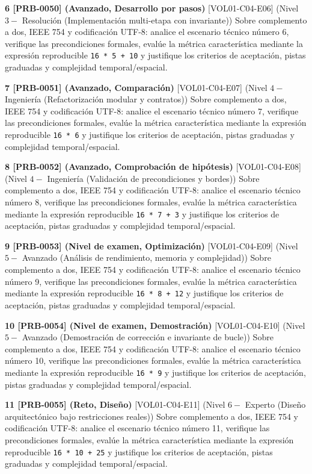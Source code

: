 \documentclass{book}
\begin{document}
\begin{tcolorbox}[title={Ejercicios}, studiumworked, breakable]
\noindent\textbf{6 [PRB-0050] (Avanzado, Desarrollo por pasos)}
[VOL01-C04-E06] (Nivel \(3 -\) Resolución (Implementación multi-etapa con invariante)) Sobre complemento a dos, IEEE 754 y codificación UTF-8: analice el escenario técnico número 6, verifique las precondiciones formales, evalúe la métrica característica mediante la expresión reproducible \texttt{16 * 5 + 10} y justifique los criterios de aceptación, pistas graduadas y complejidad temporal/espacial.

\noindent\textbf{7 [PRB-0051] (Avanzado, Comparación)}
[VOL01-C04-E07] (Nivel \(4 -\) Ingeniería (Refactorización modular y contratos)) Sobre complemento a dos, IEEE 754 y codificación UTF-8: analice el escenario técnico número 7, verifique las precondiciones formales, evalúe la métrica característica mediante la expresión reproducible \texttt{16 * 6} y justifique los criterios de aceptación, pistas graduadas y complejidad temporal/espacial.

\noindent\textbf{8 [PRB-0052] (Avanzado, Comprobación de hipótesis)}
[VOL01-C04-E08] (Nivel \(4 -\) Ingeniería (Validación de precondiciones y bordes)) Sobre complemento a dos, IEEE 754 y codificación UTF-8: analice el escenario técnico número 8, verifique las precondiciones formales, evalúe la métrica característica mediante la expresión reproducible \texttt{16 * 7 + 3} y justifique los criterios de aceptación, pistas graduadas y complejidad temporal/espacial.

\noindent\textbf{9 [PRB-0053] (Nivel de examen, Optimización)}
[VOL01-C04-E09] (Nivel \(5 -\) Avanzado (Análisis de rendimiento, memoria y complejidad)) Sobre complemento a dos, IEEE 754 y codificación UTF-8: analice el escenario técnico número 9, verifique las precondiciones formales, evalúe la métrica característica mediante la expresión reproducible \texttt{16 * 8 + 12} y justifique los criterios de aceptación, pistas graduadas y complejidad temporal/espacial.

\noindent\textbf{10 [PRB-0054] (Nivel de examen, Demostración)}
[VOL01-C04-E10] (Nivel \(5 -\) Avanzado (Demostración de corrección e invariante de bucle)) Sobre complemento a dos, IEEE 754 y codificación UTF-8: analice el escenario técnico número 10, verifique las precondiciones formales, evalúe la métrica característica mediante la expresión reproducible \texttt{16 * 9} y justifique los criterios de aceptación, pistas graduadas y complejidad temporal/espacial.

\noindent\textbf{11 [PRB-0055] (Reto, Diseño)}
[VOL01-C04-E11] (Nivel \(6 -\) Experto (Diseño arquitectónico bajo restricciones reales)) Sobre complemento a dos, IEEE 754 y codificación UTF-8: analice el escenario técnico número 11, verifique las precondiciones formales, evalúe la métrica característica mediante la expresión reproducible \texttt{16 * 10 + 25} y justifique los criterios de aceptación, pistas graduadas y complejidad temporal/espacial.


\end{tcolorbox}
\end{document}
